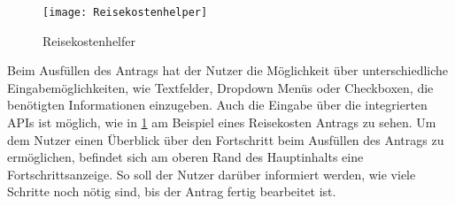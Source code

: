 \begin{figure}[h]
  \centering
    \texttt{[image: Reisekostenhelper]}
    \caption{Reisekostenhelfer}\label{Reisekostenhelfer}
\end{figure}


Beim Ausfüllen des Antrags hat der Nutzer die Möglichkeit über unterschiedliche Eingabemöglichkeiten, 
wie Textfelder, Dropdown Menüs oder Checkboxen, die benötigten Informationen einzugeben. Auch die Eingabe 
über die integrierten APIs ist möglich, wie in \ref{Reisekostenhelfer} am Beispiel eines Reisekosten Antrags zu sehen. 
Um dem Nutzer einen Überblick über den Fortschritt beim Ausfüllen des Antrags zu ermöglichen, befindet sich am oberen 
Rand des Hauptinhalts eine Fortschrittsanzeige. So soll der Nutzer darüber informiert werden, wie viele Schritte noch 
nötig sind, bis der Antrag fertig bearbeitet ist. 



